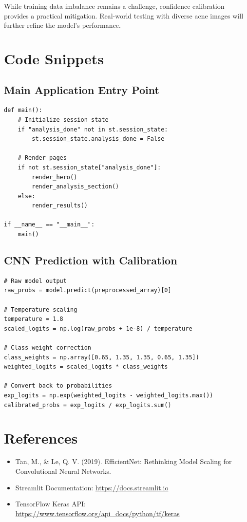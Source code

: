 \documentclass[12pt,a4paper]{article}
\begin{document}
While training data imbalance remains a challenge, confidence calibration provides a practical mitigation. Real-world testing with diverse acne images will further refine the model's performance.

\appendix

\section{Code Snippets}

\subsection{Main Application Entry Point}

\begin{lstlisting}
def main():
    # Initialize session state
    if "analysis_done" not in st.session_state:
        st.session_state.analysis_done = False
    
    # Render pages
    if not st.session_state["analysis_done"]:
        render_hero()
        render_analysis_section()
    else:
        render_results()

if __name__ == "__main__":
    main()
\end{lstlisting}

\subsection{CNN Prediction with Calibration}

\begin{lstlisting}
# Raw model output
raw_probs = model.predict(preprocessed_array)[0]

# Temperature scaling
temperature = 1.8
scaled_logits = np.log(raw_probs + 1e-8) / temperature

# Class weight correction
class_weights = np.array([0.65, 1.35, 1.35, 0.65, 1.35])
weighted_logits = scaled_logits * class_weights

# Convert back to probabilities
exp_logits = np.exp(weighted_logits - weighted_logits.max())
calibrated_probs = exp_logits / exp_logits.sum()
\end{lstlisting}

\section{References}

\begin{itemize}
    \item Tan, M., \& Le, Q. V. (2019). EfficientNet: Rethinking Model Scaling for Convolutional Neural Networks.
    \item Streamlit Documentation: \url{https://docs.streamlit.io}
    \item TensorFlow Keras API: \url{https://www.tensorflow.org/api_docs/python/tf/keras}
\end{itemize}
\end{document}

